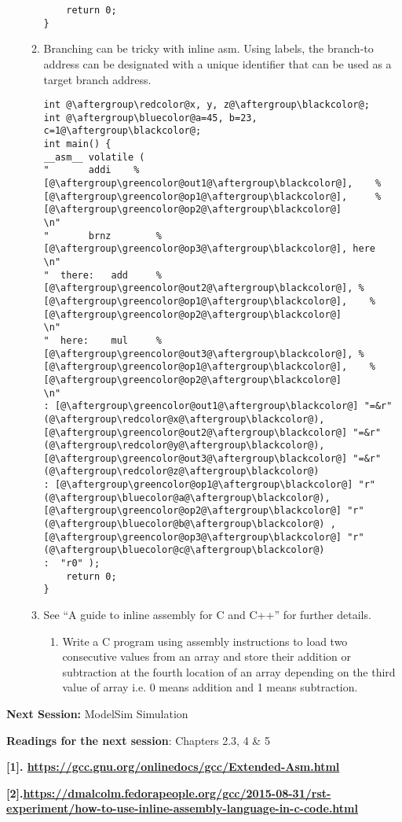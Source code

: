 \begin{enumerate}[start=0]
\begin{enumerate}
\begin{lstlisting}
	return 0;
}
	\end{lstlisting}
	\item
	Branching can be tricky with inline asm. Using labels, the branch-to
	address can be designated with a unique identifier that can be used as
	a target branch address.
	\begin{lstlisting}
int @\aftergroup\redcolor@x, y, z@\aftergroup\blackcolor@;
int @\aftergroup\bluecolor@a=45, b=23, c=1@\aftergroup\blackcolor@;
int main() {
__asm__ volatile ( 
"  		addi 	%[@\aftergroup\greencolor@out1@\aftergroup\blackcolor@], 	%[@\aftergroup\greencolor@op1@\aftergroup\blackcolor@], 	%[@\aftergroup\greencolor@op2@\aftergroup\blackcolor@]                    \n"     
" 	 	brnz     	%[@\aftergroup\greencolor@op3@\aftergroup\blackcolor@],	here                          	\n"         
"  there: 	add 	%[@\aftergroup\greencolor@out2@\aftergroup\blackcolor@], %[@\aftergroup\greencolor@op1@\aftergroup\blackcolor@], 	%[@\aftergroup\greencolor@op2@\aftergroup\blackcolor@]                    \n"       
"  here:  	mul 	%[@\aftergroup\greencolor@out3@\aftergroup\blackcolor@], %[@\aftergroup\greencolor@op1@\aftergroup\blackcolor@], 	%[@\aftergroup\greencolor@op2@\aftergroup\blackcolor@]                   	\n"         
: [@\aftergroup\greencolor@out1@\aftergroup\blackcolor@] "=&r" (@\aftergroup\redcolor@x@\aftergroup\blackcolor@),	[@\aftergroup\greencolor@out2@\aftergroup\blackcolor@] "=&r" (@\aftergroup\redcolor@y@\aftergroup\blackcolor@), 	[@\aftergroup\greencolor@out3@\aftergroup\blackcolor@] "=&r" (@\aftergroup\redcolor@z@\aftergroup\blackcolor@)                                    
: [@\aftergroup\greencolor@op1@\aftergroup\blackcolor@] "r" (@\aftergroup\bluecolor@a@\aftergroup\blackcolor@),	[@\aftergroup\greencolor@op2@\aftergroup\blackcolor@] "r" (@\aftergroup\bluecolor@b@\aftergroup\blackcolor@) ,	[@\aftergroup\greencolor@op3@\aftergroup\blackcolor@] "r" (@\aftergroup\bluecolor@c@\aftergroup\blackcolor@)
:  "r0" );
	return 0;
}
	\end{lstlisting}
	\item See ``A guide to inline assembly for C and C++'' for further details.
	\begin{enumerate}[label=(\alph*)]
	\color{red}\item\normalcolor
	Write a C program using assembly instructions to load two consecutive
	values from an array and store their addition or subtraction at the
	fourth location of an array depending on the third value of array i.e.
	0 means addition and 1 means subtraction.
	\end{enumerate}
\end{enumerate}
\end{enumerate}

\textbf{Next Session:} ModelSim Simulation

\textbf{Readings for the next session}: Chapters 2.3, 4 \& 5

\textbf{{[}1{]}.
	\url{https://gcc.gnu.org/onlinedocs/gcc/Extended-Asm.html}}

\textbf{{[}2{]}.\url{https://dmalcolm.fedorapeople.org/gcc/2015-08-31/rst-experiment/how-to-use-inline-assembly-language-in-c-code.html}}
